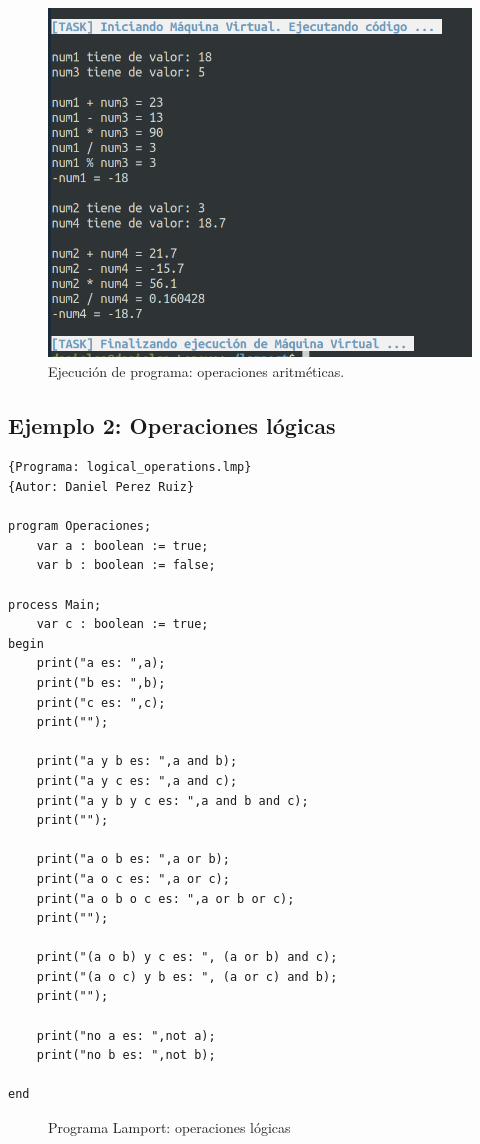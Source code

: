 \newpage
\begin{figure}[h]
    \includegraphics[width=\linewidth]{images/ejemplos/arithmeticOperations.png}
    \caption{Ejecución de programa: operaciones aritméticas.}
    \label{fig:lamportArithmeticOperations_exec}
\end{figure}

\newpage
\subsection{Ejemplo 2: Operaciones lógicas}
\begin{lstlisting}[style=lamportStyle]
{Programa: logical_operations.lmp}
{Autor: Daniel Perez Ruiz}

program Operaciones;
	var a : boolean := true;
	var b : boolean := false;

process Main;
	var c : boolean := true;
begin
	print("a es: ",a);
	print("b es: ",b);
	print("c es: ",c);
	print("");
	
	print("a y b es: ",a and b);
	print("a y c es: ",a and c);
	print("a y b y c es: ",a and b and c);
	print("");
	
	print("a o b es: ",a or b);
	print("a o c es: ",a or c);
	print("a o b o c es: ",a or b or c);
	print("");
	
	print("(a o b) y c es: ", (a or b) and c);
	print("(a o c) y b es: ", (a or c) and b);
	print("");
	
	print("no a es: ",not a);
	print("no b es: ",not b);
	
end
\end{lstlisting}
\begin{figure}[h]
\caption{Programa Lamport: operaciones lógicas}
\label{fig:lamportLogicalOperations}
\end{figure}

